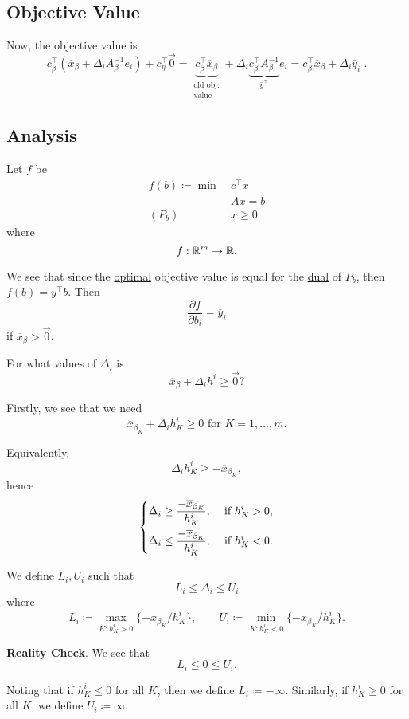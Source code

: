 \subsection{Objective Value}
Now, the objective value is
\[
	c_{\beta}^{\top}(\overline{x}_{\beta}+\Delta_{i}A_{\beta}^{-1}e_{i})+ c_{\eta}^{\top}\vec{0} = \underbrace{c_{\beta}^{\top}\overline{x}_{\beta}}_{\substack{\text{old obj.}\\\text{value}}}+\Delta_{i}\underbrace{c_{\beta}^{\top}A_{\beta}^{-1}}_{\overline{y}^{\top}}e_{i} = c_{\beta}^{\top}\overline{x}_{\beta}+\Delta_{i}\overline{y}^{\top}_i.
\]

\subsection{Analysis}
Let \(f\) be
\begin{align*}
	f(b)\coloneqq \min~ & c^{\top}x \\
	                    & Ax = b    \\
	(P_b)\quad          & x\geq 0
\end{align*}
where
\[
	f: \mathbb{\MakeUppercase{R}}^{m}\to \mathbb{\MakeUppercase{R}}.
\]

We see that since the \hyperref[def:optimal-solution]{optimal} objective value is equal for the \hyperref[def:dual]{dual} of \(P_b\), then \(f(b) = y^{\top}b\). Then
\[
	\frac{\partial f}{\partial b_{i}} = \overline{y}_i
\]
if \(\overline{x}_{\beta}>\vec{0}\).

\begin{problem}
For what values of \(\Delta_{i}\) is
\[
	\overline{x}_{\beta} + \Delta_{i}h^i \geq \vec{0}?
\]
\end{problem}
\begin{answer}
	Firstly, we see that we need
	\[
		\overline{x}_{\beta_K}+\Delta_{i}h^i_K \geq 0 \text{ for }K = 1, \ldots , m.
	\]

	Equivalently,
	\[
		\Delta_{i}h^i_K \geq -\overline{x}_{\beta_K},
	\]
	hence
	\[
		\begin{dcases}
			\Delta_{i}\geq \frac{-\overline{x}_{\beta_K}}{h^i_K}, & \text{ if }h^i_K>0, \\
			\Delta_{i}\leq \frac{-\overline{x}_{\beta_K}}{h^i_K}, & \text{ if }h^i_K<0.
		\end{dcases}
	\]

	We define \(L_{i}, U_{i}\) such that
	\[
		L_{i}\leq \Delta_{i}\leq U_{i}
	\]
	where
	\[
		L_{i} \coloneqq \max_{K\colon h^i_K > 0}\{-\overline{x}_{\beta_K}/h^i_K\},\qquad U_{i} \coloneqq \min_{K\colon h^i_K < 0}\{-\overline{x}_{\beta_K}/h^i_K\}.
	\]

	\textbf{Reality Check}. We see that
	\[
		L_{i}\leq 0\leq U_{i}.
	\]

	\begin{remark}
		Noting that if \(h^i_K\leq 0\) for all \(K\), then we define \(L_{i} \coloneqq -\infty \). Similarly, if \(h^i_K\geq 0\) for all \(K\), we define \(U_i \coloneqq \infty \).
	\end{remark}
\end{answer}

